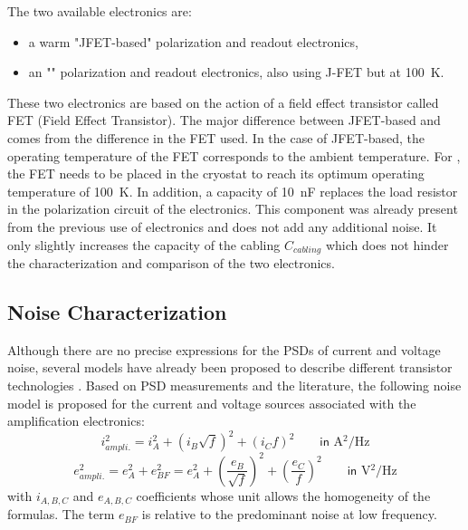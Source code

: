 The two available electronics are:
\begin{itemize}
\item a warm "JFET-based" polarization and readout electronics,
\item an "\Edelweiss{}" polarization and readout electronics, also using J-FET but at \SI{100}{\kelvin}.
\end{itemize}
These two electronics are based on the action of a field effect transistor called FET (Field Effect Transistor). The major difference between JFET-based and \Edelweiss{} comes from the difference in the FET used. In the case of JFET-based, the operating temperature of the FET corresponds to the ambient temperature. For \Edelweiss{}, the FET needs to be placed in the cryostat to reach its optimum operating temperature of \SI{100}{\kelvin}. In addition, a capacity of \SI{10}{\nano\farad} replaces the load resistor in the polarization circuit of the \Edelweiss{} electronics. This component was already present from the previous use of \Edelweiss{} electronics and does not add any additional noise. It only slightly increases the capacity of the cabling  $C_{cabling}$ which does not hinder the characterization and comparison of the two electronics.


\subsection{Noise Characterization}

Although there are no precise expressions for the PSDs of current and voltage noise, several models have already been proposed to describe different transistor technologies \cite{Motchenbacher:1993low} \cite{Juillard:1999}.
Based on PSD measurements and the literature, the following noise model is proposed for the current and voltage sources associated with the amplification electronics:
\begin{equation}
\label{eq:i-amplifier}
i_{ampli.}^2 = i_A^2 + (i_B \sqrt{f})^2 + (i_C f)^2 \qquad \textsf{in } \si{\ampere^2\per\Hz}
\end{equation}
\begin{equation}
\label{eq:e-amplifier}
e_{ampli.}^2 = e_A^2 + e_{BF}^2 = e_A^2 + \left( \frac{e_B}{\sqrt{f}} \right)^2 +\left( \frac{e_C}{f} \right)^2 \qquad \textsf{in } \si{\volt^2\per\Hz}
\end{equation}
with $i_{A,B,C}$ and $e_{A,B,C}$ coefficients whose unit allows the homogeneity of the formulas. The term $e_{BF}$ is relative to the predominant noise at low frequency.

